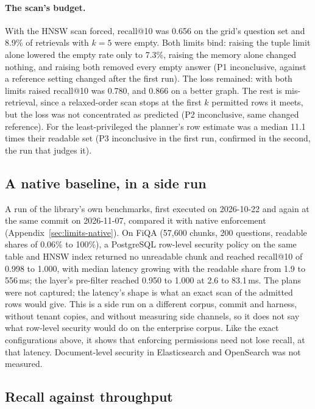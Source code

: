 \paragraph{The scan's budget.}
With the HNSW scan forced, recall@10 was 0.656 on the grid's question set and 8.9\% of retrievals with $k = 5$ were empty. Both limits bind: raising the
tuple limit alone lowered the empty rate only to 7.3\%, raising the memory alone changed nothing, and raising both removed every empty answer (P1
inconclusive, against a reference setting changed after the first run).
The loss remained: with both limits raised recall@10 was 0.780, and 0.866 on a better graph. The rest is
mis-retrieval, since a relaxed-order scan stops at the first $k$ permitted rows it meets, but the loss was not concentrated as predicted (P2
inconclusive, same changed reference). For the least-privileged the planner's row estimate was a median 11.1 times their readable set (P3 inconclusive in the
first run, confirmed in the second, the run that judges it).

\subsection{A native baseline, in a side run}\label{sec:qual-native}

A run of the library's own benchmarks, first executed on 2026-10-22 and again at the same commit on 2026-11-07, compared it with native enforcement (Appendix~\ref{sec:limits-native}). On FiQA
(57,600 chunks, 200 questions, readable shares of 0.06\% to 100\%), a PostgreSQL row-level security policy on the same table and HNSW index returned
no unreadable chunk and reached recall@10 of 0.998 to 1.000, with median latency growing with the readable share from 1.9 to 556\,ms; the layer's pre-filter reached 0.950 to
1.000 at 2.6 to 83.1\,ms. The plans were not captured; the latency's shape is what an exact scan of the admitted rows would give. This is a side run on a different corpus, commit and harness, without tenant copies, and without measuring side channels,
so it does not say what row-level security would do on the enterprise corpus. Like the exact configurations above, it shows that enforcing permissions need not lose recall, at that latency. Document-level security in Elasticsearch and OpenSearch was not measured.

\subsection{Recall against throughput}\label{sec:qual-frontiers}

